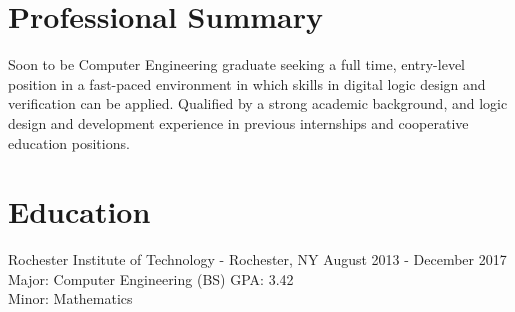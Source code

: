 \documentclass[a4paper,margin,line]{resume}
\newcommand{\rdate}[1]{\hfill {\small #1}}
\begin{document}
\begin{resume}
\section{\mysidestyle Professional Summary}
    Soon to be Computer Engineering graduate seeking a full time, entry-level position in a fast-paced environment in which skills in digital logic design and verification can be applied.  Qualified by a strong academic background, and logic design and development experience in previous internships and cooperative education positions.


\section{\mysidestyle Education}
    \begin{compactdesc}
        \item[Rochester Institute of Technology] - Rochester, NY \rdate{August 2013 - December 2017} \\
            Major: Computer Engineering (BS) \rdate{GPA: 3.42}\\
            Minor: Mathematics
    \end{compactdesc}


\end{resume}
\end{document}
